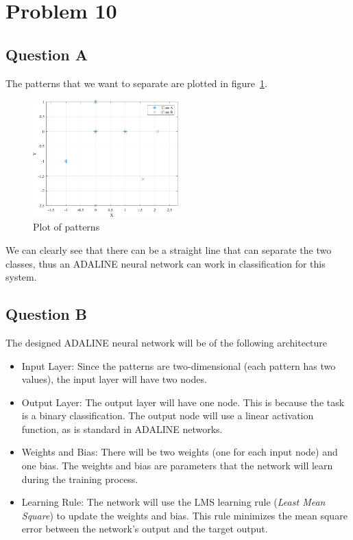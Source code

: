 \section{Problem 10}

\subsection{Question A}

The patterns that we want to separate are plotted in figure~\ref{fig:prob_10_patterns}.

\begin{figure}[htpb]
	\centering
	\includegraphics[width=0.5\textwidth]{../Problem 10/patterns.pdf}
	\caption{Plot of patterns}
	\label{fig:prob_10_patterns}
\end{figure}

We can clearly see that there can be a straight line that can separate the two classes, thus an ADALINE neural network can work in classification for this system.

\subsection{Question B}

The designed ADALINE neural network will be of the following architecture
\begin{itemize}
	\item Input Layer: Since the patterns are two-dimensional (each pattern has two values), the input layer will have two nodes.
	\item Output Layer: The output layer will have one node. This is because the task is a binary classification. The output node will use a linear activation function, as is standard in ADALINE networks.
	\item Weights and Bias: There will be two weights (one for each input node) and one bias. The weights and bias are parameters that the network will learn during the training process.
	\item Learning Rule: The network will use the LMS learning rule (\textit{Least Mean Square}) to update the weights and bias. This rule minimizes the mean square error between the network's output and the target output.
\end{itemize}

